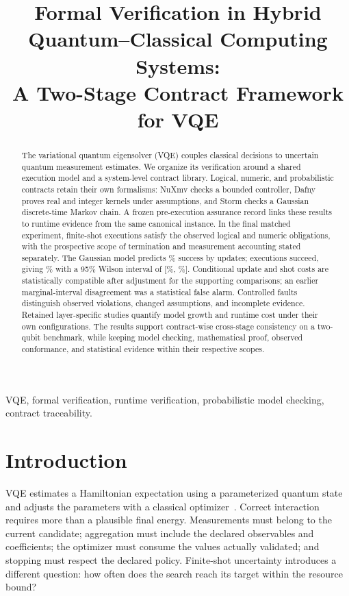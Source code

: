 \documentclass[conference]{IEEEtran}
\author{}
\title{Formal Verification in Hybrid Quantum--Classical Computing Systems:\\A Two-Stage Contract Framework for VQE}
\begin{document}
\maketitle
\begin{abstract}
The variational quantum eigensolver (VQE) couples classical decisions to uncertain quantum measurement estimates. We organize its verification around a shared execution model and a system-level contract library. Logical, numeric, and probabilistic contracts retain their own formalisms: NuXmv checks a bounded controller, Dafny proves real and integer kernels under assumptions, and Storm checks a Gaussian discrete-time Markov chain. A frozen pre-execution assurance record links these results to runtime evidence from the same canonical instance. In the final matched experiment, \BaselineRuns finite-shot executions satisfy the observed logical and numeric obligations, with the prospective scope of termination and measurement accounting stated separately. The Gaussian model predicts \PrimaryModelPercent\% success by \UpdateBound updates; \SuccessRuns executions succeed, giving \PrimaryEmpiricalPercent\% with a 95\% Wilson interval of [\PrimaryCILower\%, \PrimaryCIUpper\%]. Conditional update and shot costs are statistically compatible after adjustment for the supporting comparisons; an earlier marginal-interval disagreement was a statistical false alarm. Controlled faults distinguish observed violations, changed assumptions, and incomplete evidence. Retained layer-specific studies quantify model growth and runtime cost under their own configurations. The results support contract-wise cross-stage consistency on a two-qubit benchmark, while keeping model checking, mathematical proof, observed conformance, and statistical evidence within their respective scopes.
\end{abstract}
\begin{IEEEkeywords}
VQE, formal verification, runtime verification, probabilistic model checking, contract traceability.
\end{IEEEkeywords}

\section{Introduction}
\label{sec:introduction}
VQE estimates a Hamiltonian expectation using a parameterized quantum state and adjusts the parameters with a classical optimizer~\cite{peruzzo2014,mcclean2016}. Correct interaction requires more than a plausible final energy. Measurements must belong to the current candidate; aggregation must include the declared observables and coefficients; the optimizer must consume the values actually validated; and stopping must respect the declared policy. Finite-shot uncertainty introduces a different question: how often does the search reach its target within the resource bound?
\end{document}
